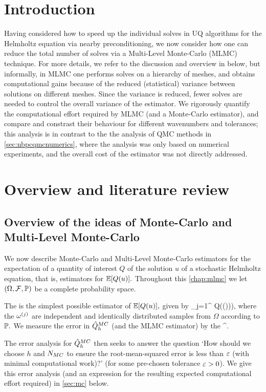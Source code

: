 \section{Introduction}

Having considered how to speed up the individual solves in UQ algorithms for the Helmholtz equation via nearby preconditioning, we now consider how one can reduce the total number of solves via a Multi-Level Monte-Carlo (MLMC) technique. For more details, we refer to the discussion and overview in below, but informally, in MLMC one performs solves on a hierarchy of meshes, and obtains computational gains because of the reduced (statistical) variance between solutions on different meshes. Since the variance is reduced, fewer solves are needed to control the overall variance of the estimator. We rigorously quantify the computational effort required by MLMC (and a Monte-Carlo estimator), and compare and constrast their behaviour for different wavenumbers and tolerances; this analysis is in contrast to the the analysis of QMC methods in \cref{sec:nbpcqmcnumerics}, where the analysis was only based on numerical experiments, and the overall cost of the estimator was not directly addressed.

\section{Overview and literature review}
\subsection{Overview of the ideas of Monte-Carlo and Multi-Level Monte-Carlo}
We now describe Monte-Carlo and Multi-Level Monte-Carlo estimators for the expectation of a quantity of interest $Q$ of the solution $u$ of a stochastic Helmholtz equation, that is, estimators for $\EXP{Q(u)}.$ Throughout this \cref{chap:mlmc} we let $\OFP$ be a complete probability space.

The  is the simplest possible estimator of $\EXP{Q(u)},$ given by
\beqs
\QhatMC \de {} \sum_{j=1}^{\NMC} Q\mleft(\uh\mleft(\omegasj\mright))\mright),
\eeqs
where the $\omega^{(j)}$ are independent and identically distributed samples from $\Omega$ according to $\mathbb P.$ We measure the error in $\hat{Q}^{MC}_{h}$ (and the MLMC estimator) by the 
\beqs
{}^{\half}.
\eeqs

The error analysis for $\hat{Q}^{MC}_{h}$ then seeks to answer the question `How should we choose $h$ and $N_{MC}$ to ensure the root-mean-squared error is less than $\varepsilon$ (with minimal computational work)?' (for some pre-chosen tolerance $\varepsilon > 0$). We give this error analysis (and an expression for the resulting expected computational effort required) in \cref{sec:mc} below.

